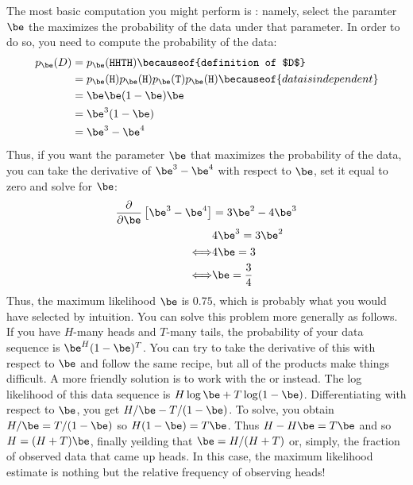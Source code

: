The most basic computation you might perform is : namely, select the paramter $\be$ the
maximizes the probability of the data under that parameter.  In order
to do so, you need to compute the probability of the data:
%
\begin{align} \label{eq:prob:binomial}
  p_\be(D)
  &= p_\be(\texttt{HHTH})
     \becauseof{definition of $D$} \\
  &= p_\be(\texttt{H})
     p_\be(\texttt{H})
     p_\be(\texttt{T})
     p_\be(\texttt{H})
      \becauseof{data is independent} \\
  &= \be \be (1-\be) \be \\
  &= \be^3 (1-\be) \\
  &= \be^3 - \be^4
\end{align}
%
Thus, if you want the parameter $\be$ that maximizes the probability
of the data, you can take the derivative of $\be^3-\be^4$ with respect
to $\be$, set it equal to zero and solve for $\be$:
%
\begin{align}
  \frac {\partial} {\partial \be} \left[ \be^3 - \be^4 \right] &= 3 \be^2 -  4\be^3\\
       & 4\be^3 = 3\be^2  \\
  \Longleftrightarrow & 4\be = 3 \\
  \Longleftrightarrow & \be  = \frac 3 4
\end{align}
%
Thus, the maximum likelihood $\be$ is $0.75$, which is probably what
you would have selected by intuition.
%
You can solve this problem more generally as follows.  If you have
$H$-many heads and $T$-many tails, the probability of your data
sequence is $\be^H (1-\be)^T$.  You can try to take the derivative of
this with respect to $\be$ and follow the same recipe, but all of the
products make things difficult.  A more friendly solution is to work
with the  or 
instead.  The log likelihood of this data sequence is $H \log \be + T
\log (1-\be)$.  Differentiating with respect to $\be$, you get $H/\be
- T/(1-\be)$.  To solve, you obtain $H/\be = T/(1-\be)$ so $H (1-\be)
= T \be$.  Thus $H - H\be = T\be$ and so $H = (H+T) \be$, finally
yeilding that $\be = H/(H+T)$ or, simply, the fraction of observed
data that came up heads.  In this case, the maximum likelihood
estimate is nothing but the relative frequency of observing heads!


